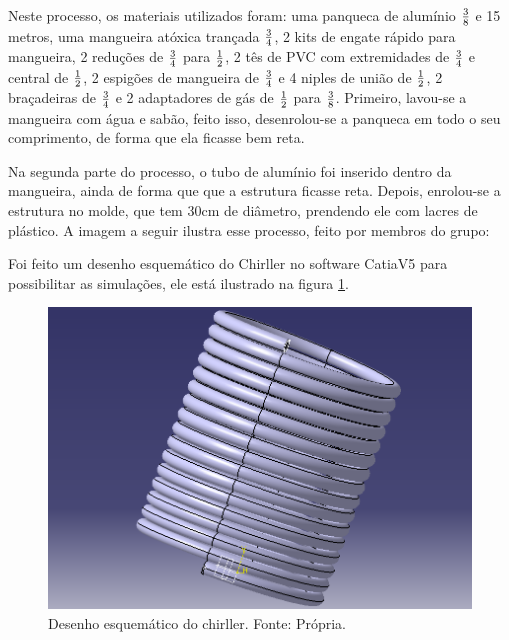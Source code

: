                 Neste processo, os materiais utilizados foram: uma panqueca de alumínio $3 \over 8$ e
                15 metros, uma mangueira atóxica trançada $3 \over 4$, 2 kits de engate rápido para
                mangueira, 2  reduções de $3 \over 4$ para $1 \over 2$, 2 tês de PVC com extremidades de $3 \over 4$
                e central de $1 \over 2$, 2 espigões de mangueira de $3 \over 4$ e 4 niples de união de $1 \over 2$,
                2 braçadeiras de $3 \over 4$ e 2 adaptadores de gás de $1 \over 2$ para $3 \over 8$.
                Primeiro, lavou-se a mangueira com água e sabão, feito isso,
                desenrolou-se a panqueca em todo o seu comprimento, de forma que ela
                ficasse bem reta. 
                
                Na segunda parte do processo, o tubo de alumínio foi inserido dentro da
                mangueira, ainda de forma que que a estrutura ficasse reta. Depois,
                enrolou-se a estrutura no molde, que tem 30cm de diâmetro, prendendo
                ele com lacres de plástico. A imagem a seguir ilustra esse processo,
                feito por membros do grupo:

                Foi feito um desenho esquemático do Chirller no software CatiaV5 para
                possibilitar as simulações, ele está ilustrado na figura \ref{desenho-chiller}.

                \begin{figure}[!htb]
                    \centering
                    \includegraphics[scale= 0.3]{figuras/desenho-chiller.png}
                    \caption{Desenho esquemático do chirller. Fonte: Própria.}
                    \label{desenho-chiller}
                \end{figure}

